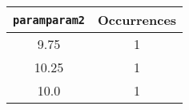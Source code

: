 \begin{longtable}{|c|c|}
\hline
\textbf{\texttt{paramparam2}} & \textbf{Occurrences} \\
\hline
9.75 & 1 \\
\hline
10.25 & 1 \\
\hline
10.0 & 1 \\
\hline
\end{longtable}